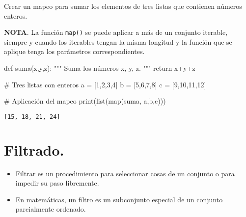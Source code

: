 \documentclass[
  letterpaper,
  DIV=11,
  numbers=noendperiod]{scrreprt}
\newenvironment{Shaded}{\begin{snugshade}}{\end{snugshade}}
\newcommand{\BuiltInTok}[1]{\textcolor[rgb]{0.00,0.23,0.31}{#1}}
\newcommand{\CommentTok}[1]{\textcolor[rgb]{0.37,0.37,0.37}{#1}}
\newcommand{\ControlFlowTok}[1]{\textcolor[rgb]{0.00,0.23,0.31}{#1}}
\newcommand{\DecValTok}[1]{\textcolor[rgb]{0.68,0.00,0.00}{#1}}
\newcommand{\KeywordTok}[1]{\textcolor[rgb]{0.00,0.23,0.31}{#1}}
\newcommand{\NormalTok}[1]{\textcolor[rgb]{0.00,0.23,0.31}{#1}}
\newcommand{\OperatorTok}[1]{\textcolor[rgb]{0.37,0.37,0.37}{#1}}
\begin{document}
Crear un mapeo para sumar los elementos de tres listas que contienen
números enteros.

\textbf{NOTA}. La función \texttt{map()} se puede aplicar a más de un
conjunto iterable, siempre y cuando los iterables tengan la misma
longitud y la función que se aplique tenga los parámetros
correspondientes.

\begin{Shaded}
\begin{Highlighting}[]
\KeywordTok{def}\NormalTok{ suma(x,y,z):}
    \CommentTok{"""}
\CommentTok{    Suma los números x, y, z.}
\CommentTok{    """}
    \ControlFlowTok{return}\NormalTok{ x}\OperatorTok{+}\NormalTok{y}\OperatorTok{+}\NormalTok{z}

\CommentTok{\# Tres listas con enteros}
\NormalTok{a }\OperatorTok{=}\NormalTok{ [}\DecValTok{1}\NormalTok{,}\DecValTok{2}\NormalTok{,}\DecValTok{3}\NormalTok{,}\DecValTok{4}\NormalTok{]}
\NormalTok{b }\OperatorTok{=}\NormalTok{ [}\DecValTok{5}\NormalTok{,}\DecValTok{6}\NormalTok{,}\DecValTok{7}\NormalTok{,}\DecValTok{8}\NormalTok{]}
\NormalTok{c }\OperatorTok{=}\NormalTok{ [}\DecValTok{9}\NormalTok{,}\DecValTok{10}\NormalTok{,}\DecValTok{11}\NormalTok{,}\DecValTok{12}\NormalTok{]}

\CommentTok{\# Aplicación del mapeo}
\BuiltInTok{print}\NormalTok{(}\BuiltInTok{list}\NormalTok{(}\BuiltInTok{map}\NormalTok{(suma, a,b,c)))}
\end{Highlighting}
\end{Shaded}

\begin{verbatim}
[15, 18, 21, 24]
\end{verbatim}


\chapter{Filtrado.}\label{filtrado.}

\begin{itemize}
\item
  Filtrar es un procedimiento para seleccionar cosas de un conjunto o
  para impedir su paso libremente.
\item
  En matemáticas, un filtro es un subconjunto especial de un conjunto
  parcialmente ordenado.
\end{itemize}
\end{document}
